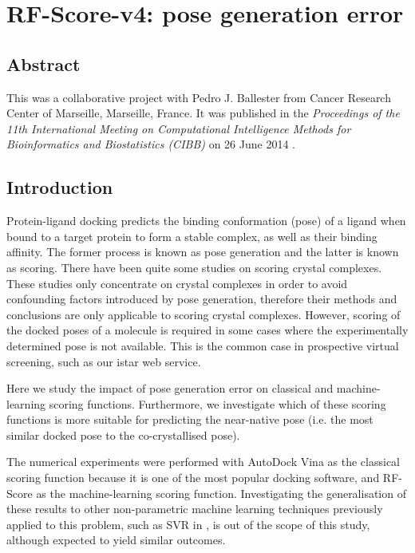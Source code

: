 \chapter{RF-Score-v4: pose generation error}

\section{Abstract}

This was a collaborative project with Pedro J. Ballester from Cancer Research Center of Marseille, Marseille, France. It was published in the \textit{Proceedings of the 11th International Meeting on Computational Intelligence Methods for Bioinformatics and Biostatistics (CIBB)} on 26 June 2014 \citep{1434}.

\section{Introduction}

Protein-ligand docking predicts the binding conformation (pose) of a ligand when bound to a target protein to form a stable complex, as well as their binding affinity. The former process is known as pose generation and the latter is known as scoring. There have been quite some studies \citep{1432,1433} on scoring crystal complexes. These studies only concentrate on crystal complexes in order to avoid confounding factors introduced by pose generation, therefore their methods and conclusions are only applicable to scoring crystal complexes. However, scoring of the docked poses of a molecule is required in some cases where the experimentally determined pose is not available. This is the common case in prospective virtual screening, such as our istar web service.

Here we study the impact of pose generation error on classical and machine-learning scoring functions. Furthermore, we investigate which of these scoring functions is more suitable for predicting the near-native pose (i.e. the most similar docked pose to the co-crystallised pose).

The numerical experiments were performed with AutoDock Vina \citep{595} as the classical scoring function because it is one of the most popular docking software, and RF-Score \citep{564} as the machine-learning scoring function. Investigating the generalisation of these results to other non-parametric machine learning techniques previously applied to this problem, such as SVR in \citep{1295}, is out of the scope of this study, although expected to yield similar outcomes.

